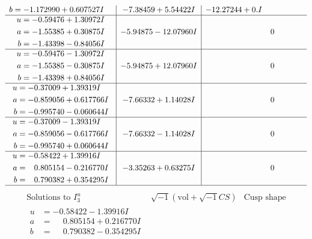 \documentclass[1p]{elsarticle_modified}
\theoremstyle{definition}
\newcommand{\I}{\sqrt{-1}}
\begin{document}
$$\begin{array}{c|c|c}
\begin{aligned}
b &= -1.172990 + 0.607527 I\end{aligned}
 & -7.38459 + 5.54422 I & -12.27244 + 0. I\phantom{ +0.000000I} \\ \hline\begin{aligned}
u &= -0.59476 + 1.30972 I \\
a &= -1.55385 + 0.30875 I \\
b &= -1.43398 - 0.84056 I\end{aligned}
 & -5.94875 - 12.07960 I & \phantom{-0.000000 } 0 \\ \hline\begin{aligned}
u &= -0.59476 - 1.30972 I \\
a &= -1.55385 - 0.30875 I \\
b &= -1.43398 + 0.84056 I\end{aligned}
 & -5.94875 + 12.07960 I & \phantom{-0.000000 } 0 \\ \hline\begin{aligned}
u &= -0.37009 + 1.39319 I \\
a &= -0.859056 + 0.617766 I \\
b &= -0.995740 - 0.060644 I\end{aligned}
 & -7.66332 + 1.14028 I & \phantom{-0.000000 } 0 \\ \hline\begin{aligned}
u &= -0.37009 - 1.39319 I \\
a &= -0.859056 - 0.617766 I \\
b &= -0.995740 + 0.060644 I\end{aligned}
 & -7.66332 - 1.14028 I & \phantom{-0.000000 } 0 \\ \hline\begin{aligned}
u &= -0.58422 + 1.39916 I \\
a &= \phantom{-}0.805154 - 0.216770 I \\
b &= \phantom{-}0.790382 + 0.354295 I\end{aligned}
 & -3.35263 + 0.63275 I & \phantom{-0.000000 } 0\\
 \hline 
 \end{array}$$\newpage$$\begin{array}{c|c|c}  
\text{Solutions to }I^u_{3}& \I (\text{vol} + \sqrt{-1}CS) & \text{Cusp shape}\\
 \hline 
\begin{aligned}
u &= -0.58422 - 1.39916 I \\
a &= \phantom{-}0.805154 + 0.216770 I \\
b &= \phantom{-}0.790382 - 0.354295 I\end{aligned}

\end{array}$$
\end{document}
